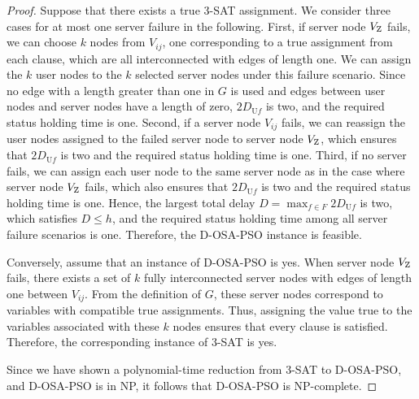 \documentclass[10pt, letterpaper]{IEEEtran}
\begin{document}
\begin{CJK}{UTF8}{ipxm}
\begin{proof}
Suppose that there exists a true 3-SAT assignment. 
We consider three cases for at most one server failure in the following.
First, if server node $V_{\rm Z}$ fails, we can choose $k$ nodes from $V_{ij}$, one corresponding to a true assignment from each clause, which are all interconnected with edges of length one.
We can assign the $k$ user nodes to the $k$ selected server nodes under this failure scenario.
Since no edge with a length greater than one in $G$ is used and edges between user nodes and server nodes have a length of zero, $2D_{\mathrm{U}f}$  is two, and the required status holding time is one.
Second, if a server node $V_{ij}$ fails, we can reassign the user nodes assigned to the failed server node to server node $V_{\rm Z}$, which ensures that $2D_{\mathrm{U}f}$ is two and the required status holding time is one.
Third, if no server fails, we can assign each user node to the same server node as in the case where server node $V_{\rm Z}$ fails, which also ensures that $2D_{\mathrm{U}f}$ is two and the required status holding time is one.
Hence, the largest total delay $D = \max_{f \in F}{2D_{\mathrm{U}f}}$ is two, which satisfies $D \leq h$, and the required status holding time among all server failure scenarios is one.
Therefore, the D-OSA-PSO instance is feasible.

Conversely, assume that an instance of D-OSA-PSO is yes.
When server node $V_{\rm Z}$ fails, there exists a set of $k$ fully interconnected server nodes with edges of length one between $V_{ij}$.
From the definition of $G$, these server nodes correspond to variables with compatible true assignments.
Thus, assigning the value true to the variables associated with these $k$ nodes ensures that every clause is satisfied.
Therefore, the corresponding instance of 3-SAT is yes.

Since we have shown a polynomial-time reduction from 3-SAT to D-OSA-PSO, and D-OSA-PSO is in NP, it follows that D-OSA-PSO is NP-complete.
\end{proof}


\end{CJK}
\end{document}
